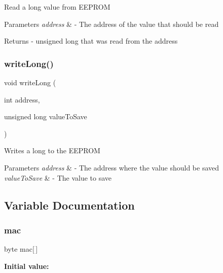 Read a long value from E\+E\+P\+R\+OM 
\begin{DoxyParams}{Parameters}
{\em address} & -\/ The address of the value that should be read \\
\hline
\end{DoxyParams}
\begin{DoxyReturn}{Returns}
-\/ unsigned long that was read from the address 
\end{DoxyReturn}
\mbox{\label{test_8ino_a5b02fbb87448a058cc6f3d4a1158afc2}} 
\subsubsection{\texorpdfstring{writeLong()}{writeLong()}}
{\footnotesize\ttfamily void write\+Long (\begin{DoxyParamCaption}\item[{int}]{address,  }\item[{unsigned long}]{value\+To\+Save }\end{DoxyParamCaption})}

Writes a long to the E\+E\+P\+R\+OM 
\begin{DoxyParams}{Parameters}
{\em address} & -\/ The address where the value should be saved \\
\hline
{\em value\+To\+Save} & -\/ The value to save \\
\hline
\end{DoxyParams}


\subsection{Variable Documentation}
\mbox{\label{test_8ino_aea3f7775fecafb66a619eb2dcb0357bd}} 
\subsubsection{\texorpdfstring{mac}{mac}}
{\footnotesize\ttfamily byte mac\mbox{[}$\,$\mbox{]}}

{\bfseries Initial value\+:}
\begin{DoxyCode}{0}
\DoxyCodeLine{= \{}
\DoxyCodeLine{\}}

\end{DoxyCode}
